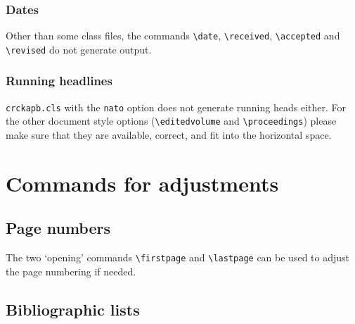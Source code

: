 \documentclass[a4paper,namedreferences]{kluwer}
\begin{document}
\begin{article}
\subsubsection*{Dates}

Other than some class files, the commands \verb+\date+, \verb+\received+,
\verb+\accepted+ and \verb+\revised+ do not generate output.

\subsubsection*{Running headlines}

\verb+crckapb.cls+ with the \verb+nato+ option does not generate running
heads either. For the other document style options (\verb+\editedvolume+ 
and \verb+\proceedings+) please make sure that they are available, 
correct, and fit into the horizontal space.


\section*{Commands for adjustments}

\subsection*{Page numbers}

The two `opening' commands \verb"\firstpage" and \verb"\lastpage" 
can be used to adjust the page numbering if needed.

                                                          



                                                                        
\subsection*{Bibliographic lists}


\end{article}
\end{document}
